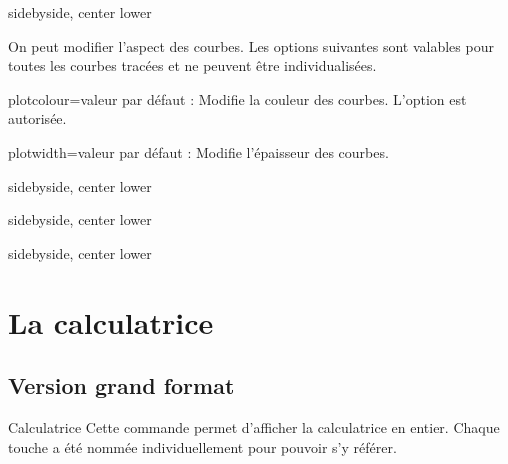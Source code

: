 \documentclass[10pt,french,a4paper]{article}
\begin{document}
\begin{dispExample*}{sidebyside, center lower}
\end{dispExample*}

On peut modifier l'aspect des courbes. Les options suivantes sont valables pour toutes les courbes tracées et ne peuvent être individualisées.

\begin{docKey}{plotcolour}{=}{valeur par défaut : }
    Modifie la couleur des courbes. L'option  est autorisée.
\end{docKey}

\begin{docKey}{plotwidth}{=}{valeur par défaut : \docValue{1pt}}
    Modifie l'épaisseur des courbes.
\end{docKey}

\begin{dispExample*}{sidebyside, center lower}
\end{dispExample*}

\begin{dispExample*}{sidebyside, center lower}
\end{dispExample*}

\begin{dispExample*}{sidebyside, center lower}
\end{dispExample*}


\section{La calculatrice}
\subsection{Version grand format}

\begin{docCommand}{Calculatrice}{}
    Cette commande permet d'afficher la calculatrice en entier. Chaque touche a été nommée individuellement pour pouvoir s'y référer.
\end{docCommand}
\end{document}
